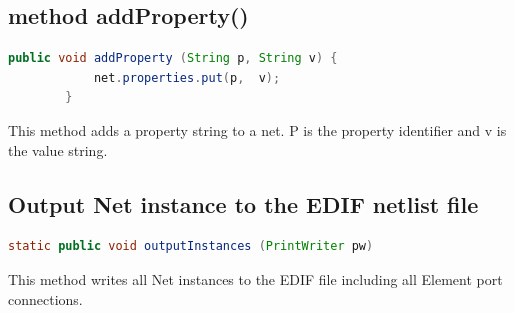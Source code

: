 \subsection{method addProperty()}

    \begin{lstlisting}[gobble=4, language=java]
        public void addProperty (String p, String v) {
            net.properties.put(p,  v);
        }
    \end{lstlisting}
    This method adds a property string to a net. P is the property identifier
    and v is the value string.

\subsection{Output Net instance to the EDIF netlist file}

    \begin{lstlisting}[gobble=4, language=java]
        static public void outputInstances (PrintWriter pw)
    \end{lstlisting}
    This method writes all Net instances to the EDIF file including
    all Element port connections.
